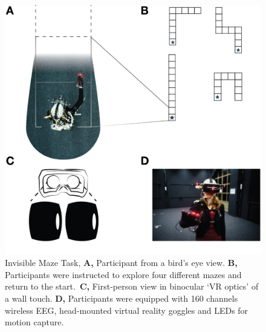 \begin{figure}[!t]
\centering
\includegraphics[width=\linewidth]{figures/IMT_Task.pdf}
\vspace{6pt}
\caption{Invisible Maze Task, \textbf{A,} Participant from a bird’s eye view. \textbf{B,} Participants were instructed to explore four different mazes and return to the start.~\cite{Gehrke2018}\textbf{C,} First-person view in binocular `VR optics' of a wall touch. \textbf{D,} Participants were equipped with 160 channels wireless EEG, head-mounted virtual reality goggles and LEDs for motion capture.}
\label{imt_task}
\end{figure}

